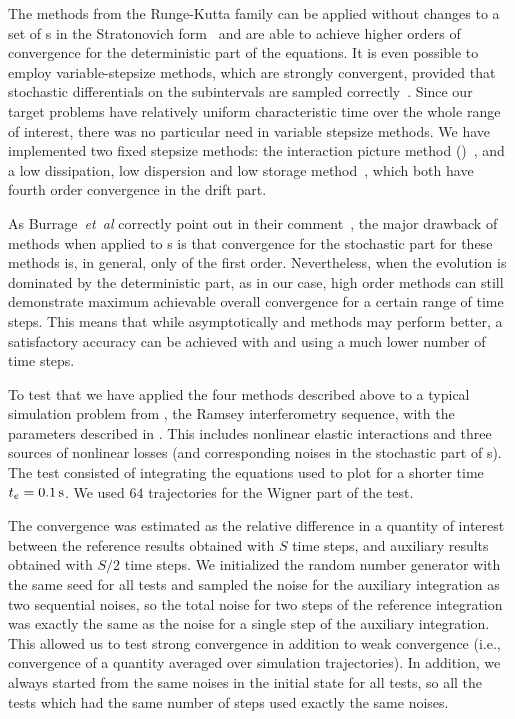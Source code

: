 The methods from the Runge-Kutta family can be applied without changes to a set of s in the Stratonovich form~\cite{Wilkie2004,Wilkie2005} and are able to achieve higher orders of convergence for the deterministic part of the equations.
It is even possible to employ variable-stepsize methods, which are strongly convergent, provided that stochastic differentials on the subintervals are sampled correctly~\cite{Wilkie2005}.
Since our target problems have relatively uniform characteristic time over the whole range of interest, there was no particular need in variable stepsize methods.
We have implemented two fixed stepsize  methods: the  interaction picture method ()~\cite{CaradocDavies2000}, and a low dissipation, low dispersion and low storage  method~\cite{Berland2006}, which both have fourth order convergence in the drift part.

As Burrage~\textit{et~al} correctly point out in their comment~\cite{Burrage2006}, the major drawback of  methods when applied to s is that convergence for the stochastic part for these methods is, in general, only of the first order.
Nevertheless, when the evolution is dominated by the deterministic part, as in our case, high order methods can still demonstrate maximum achievable overall convergence for a certain range of time steps.
This means that while asymptotically  and  methods may perform better, a satisfactory accuracy can be achieved with  and  using a much lower number of time steps.

To test that we have applied the four methods described above to a typical simulation problem from , the Ramsey interferometry sequence, with the parameters described in .
This includes nonlinear elastic interactions and three sources of nonlinear losses (and corresponding noises in the stochastic part of s).
The test consisted of integrating the equations used to plot  for a shorter time $t_e=0.1\mbox{\ensuremath{\,\mathrm{s}}}$.
We used $64$ trajectories for the Wigner part of the test.

The convergence was estimated as the relative difference in a quantity of interest between the reference results obtained with $S$ time steps, and auxiliary results obtained with $S / 2$ time steps.
We initialized the random number generator with the same seed for all tests and sampled the noise for the auxiliary integration as two sequential noises, so the total noise for two steps of the reference integration was exactly the same as the noise for a single step of the auxiliary integration.
This allowed us to test strong convergence in addition to weak convergence (i.e., convergence of a quantity averaged over simulation trajectories).
In addition, we always started from the same noises in the initial state for all tests, so all the tests which had the same number of steps used exactly the same noises.

